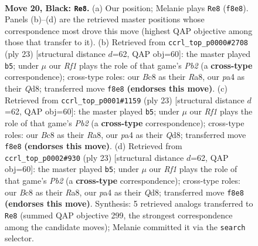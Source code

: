 \documentclass[11pt]{article}
\begin{document}
\clearpage

\begin{figure}[p]\centering
\begin{subfigure}{0.46\textwidth}\centering
\resizebox{\linewidth}{!}{%
\newchessgame
\chessboard[
  setfen={2bq1r1k/rp1pppbp/p2n4/3Q4/P1P5/2NP1N1B/1P3P1P/R1B2RK1 b - - 0 20},
  showmover=false,
  pgfstyle=straightmove, color=movearrow, markmove={f8-e8}
]}
\caption{}
\end{subfigure}\hfill
\begin{subfigure}{0.46\textwidth}\centering
\resizebox{\linewidth}{!}{%
\newchessgame
\chessboard[
  setfen={r2q1rk1/1p1bbppp/p2ppn2/6B1/3QP2P/2N2P2/PPP3P1/1K1R1B1R b - - 1 12},
  showmover=false,
  pgfstyle=straightmove, color=movearrow, markmove={b7-b5}
]}
\caption{}
\end{subfigure}
\\[4pt]
\begin{subfigure}{0.46\textwidth}\centering
\resizebox{\linewidth}{!}{%
\newchessgame
\chessboard[
  setfen={r2q1rk1/1p1bbppp/p2ppn2/6B1/3QP2P/2N2P2/PPP3P1/1K1R1B1R b - - 1 12},
  showmover=false,
  pgfstyle=straightmove, color=movearrow, markmove={b7-b5}
]}
\caption{}
\end{subfigure}\hfill
\begin{subfigure}{0.46\textwidth}\centering
\resizebox{\linewidth}{!}{%
\newchessgame
\chessboard[
  setfen={r2q1rk1/1p1bbppp/p2ppn2/6B1/3QP2P/2N2P2/PPP3P1/1K1R1B1R b - - 0 12},
  showmover=false,
  pgfstyle=straightmove, color=movearrow, markmove={b7-b5}
]}
\caption{}
\end{subfigure}
\caption{\textbf{Move 20, Black: \texttt{Re8}.} (a) Our position; Melanie plays \texttt{Re8} (\texttt{f8e8}). Panels (b)--(d) are the retrieved master positions whose correspondence most drove this move (highest QAP objective among those that transfer to it). (b) Retrieved from \texttt{ccrl\_top\_p0000\#2708} (ply 23) [structural distance $d$=62, QAP obj=60]: the master played \texttt{b5}; under $\mu$ our \emph{Rf1} plays the role of that game's \emph{Pb2} (a \textbf{cross-type} correspondence); cross-type roles: our \emph{B}c8 as their \emph{R}a8, our \emph{p}a4 as their \emph{Q}d8; transferred move \texttt{f8e8} \textbf{(endorses this move)}. (c) Retrieved from \texttt{ccrl\_top\_p0001\#1159} (ply 23) [structural distance $d$=62, QAP obj=60]: the master played \texttt{b5}; under $\mu$ our \emph{Rf1} plays the role of that game's \emph{Pb2} (a \textbf{cross-type} correspondence); cross-type roles: our \emph{B}c8 as their \emph{R}a8, our \emph{p}a4 as their \emph{Q}d8; transferred move \texttt{f8e8} \textbf{(endorses this move)}. (d) Retrieved from \texttt{ccrl\_top\_p0002\#930} (ply 23) [structural distance $d$=62, QAP obj=60]: the master played \texttt{b5}; under $\mu$ our \emph{Rf1} plays the role of that game's \emph{Pb2} (a \textbf{cross-type} correspondence); cross-type roles: our \emph{B}c8 as their \emph{R}a8, our \emph{p}a4 as their \emph{Q}d8; transferred move \texttt{f8e8} \textbf{(endorses this move)}. Synthesis: 5 retrieved analogs transferred to \texttt{Re8} (summed QAP objective 299, the strongest correspondence among the candidate moves); Melanie committed it via the \texttt{search} selector.}
\label{fig:thought-m39}
\end{figure}
\end{document}
